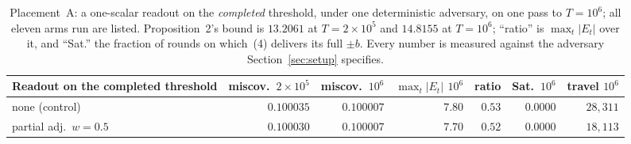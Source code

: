 \begin{table}[!ht]
\centering
\scriptsize
\setlength{\tabcolsep}{4.5pt}
\renewcommand{\arraystretch}{0.95}
\caption{Placement~A: a one-scalar readout on the \emph{completed} threshold, under one
deterministic adversary, on one pass to $T = 10^6$; all eleven arms run are listed.
Proposition~2's bound is $13.2061$ at $T = 2{\times}10^5$ and $14.8155$ at $T = 10^6$;
``ratio'' is $\max_t|E_t|$ over it, and ``Sat.'' the fraction of rounds on which~(4)
delivers its full $\pm b$. Every number is measured against the adversary
Section~\ref{sec:setup} specifies.}
\label{tab:forfeit}
\begin{tabular}{@{}lrrrrrr@{}}
\toprule
Readout on the completed threshold & miscov.\ $2{\times}10^5$ & miscov.\ $10^6$ &
$\max_t|E_t|$ $10^6$ & ratio & Sat.\ $10^6$ & travel $10^6$ \\
\midrule
none (control)                & $0.100035$ & $0.100007$ & $7.80$        & $0.53$     & $0.0000$ & $28{,}311$ \\
partial adj.\ $w = 0.5$       & $0.100030$ & $0.100007$ & $7.70$        & $0.52$     & $0.0000$ & $18{,}113$ \\

\end{tabular}
\end{table}
